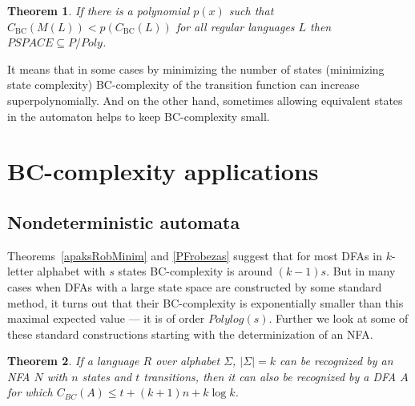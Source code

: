 \documentclass[copyright, creativecommons]{eptcs}
\newcommand{\cBC}{C_\mathrm{BC}}
\newtheorem{theorem}{Theorem}[section]
\begin{document}
\begin{theorem}
If there is a polynomial $p(x)$ such that
$\cBC(M(L))<p(\cBC(L))$
for all regular languages $L$ then $PSPACE\subseteq P/Poly$.
\label{superTeorem}
\end{theorem}

It means that in some cases by minimizing the number of states
(minimizing state complexity) BC-complexity
of the transition function can increase superpolynomially. And on the other hand, sometimes allowing equivalent states
in the automaton helps to keep BC-complexity small. 


\section{BC-complexity applications}
\subsection{Nondeterministic automata}
Theorems~\ref{apaksRobMinim} and \ref{PFrobezas} suggest that for most DFAs in $k$-letter alphabet with $s$ states BC-complexity is around $(k-1)s$. But in many cases when DFAs with a large state space
are constructed by some standard method, it turns out that their BC-complexity is exponentially smaller
than this maximal expected value --- it is of order $Polylog(s)$. Further we look at some of these
standard constructions starting with the determinization of an NFA.

\begin{theorem}
\label{nedetTrans}
If a language $R$ over alphabet $\Sigma$, $|\Sigma|=k$ can be recognized by an NFA $N$ with $n$ states
and $t$ transitions,
then it can also be recognized
by a DFA $A$ for which
$C_{BC}(A)\leq t+(k+1)n+k\log{k}$.
\end{theorem}
\end{document}

